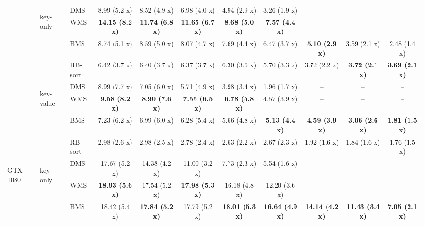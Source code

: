 \begin{table}
{\begin{tabular}{lll cccccccc}
    & \multirow{4}{*}{\begin{turn}{90}\tiny key-only\end{turn}} 
    & DMS
        & 8.99 (5.2 x) &  8.52 (4.9 x) &  6.98 (4.0 x) &  4.94 (2.9 x) &  3.26 (1.9 x) & -- & -- & -- \\
    & & WMS 
        & \textbf{14.15 (8.2 x)} &  \textbf{11.74 (6.8 x)} &  \textbf{11.65 (6.7 x)} &  \textbf{8.68 (5.0 x)} &  \textbf{7.57 (4.4 x)} & -- & -- & -- \\ 
    & & BMS
        & 8.74 (5.1 x) &  8.59 (5.0 x) &  8.07 (4.7 x) &  7.69 (4.4 x) &  6.47 (3.7 x) &  \textbf{5.10 (2.9 x)} &  3.59 (2.1 x) &  2.48 (1.4 x)  \\ 
    & & RB-sort
        & 6.42 (3.7 x) &  6.40 (3.7 x) &  6.37 (3.7 x) &  6.30 (3.6 x) &  5.70 (3.3 x) &  3.72 (2.2 x) &  \textbf{3.72 (2.1 x)} &  \textbf{3.69 (2.1 x)} \\ 
\cmidrule{2-11}
    & \multirow{4}{*}{\begin{turn}{90}\tiny key-value\end{turn}} 
    & DMS 
        & 8.99 (7.7 x) &  7.05 (6.0 x) &  5.71 (4.9 x) &  3.98 (3.4 x) &  1.96 (1.7 x) & -- & -- & -- \\
    & & WMS 
        & \textbf{9.58 (8.2 x)} &  \textbf{8.90 (7.6 x)} &  \textbf{7.55 (6.5 x)} &  \textbf{6.78 (5.8 x)} &  4.57 (3.9 x) & -- & -- & -- \\ 
    & & BMS
        & 7.23 (6.2 x) &  6.99 (6.0 x) &  6.28 (5.4 x) &  5.66 (4.8 x) &  \textbf{5.13 (4.4 x)} &  \textbf{4.59 (3.9 x)} &  \textbf{3.06 (2.6 x)} &  \textbf{1.81 (1.5 x)} \\ 
    & & RB-sort
        & 2.98 (2.6 x) &  2.98 (2.5 x) &  2.78 (2.4 x) &  2.63 (2.2 x) &  2.67 (2.3 x) &  1.92 (1.6 x) &  1.84 (1.6 x) &  1.76 (1.5 x) \\  
\midrule
\midrule
    \multirow{8}{*}{\begin{turn}{90}GTX 1080  \end{turn}}
    & \multirow{4}{*}{\begin{turn}{90}\tiny key-only\end{turn}} 
    & DMS
    & 17.67 (5.2 x) &  14.38 (4.2 x) &  11.00 (3.2 x) &  7.73 (2.3 x) &  5.54 (1.6 x) & -- & -- & -- \\
    & & WMS 
        & \textbf{18.93 (5.6 x)} &  17.54 (5.2 x) &  \textbf{17.98 (5.3 x)} &  16.18 (4.8 x) &  12.20 (3.6 x) & -- & -- & -- \\ 
    & & BMS
        & 18.42 (5.4 x) &  \textbf{17.84 (5.2 x)} &  17.79 (5.2 x) &  \textbf{18.01 (5.3 x)} &  \textbf{16.64 (4.9 x)} &  \textbf{14.14 (4.2 x)} &  \textbf{11.43 (3.4 x)} &  \textbf{7.05 (2.1 x)} \\ 

\end{tabular}}
\end{table}
